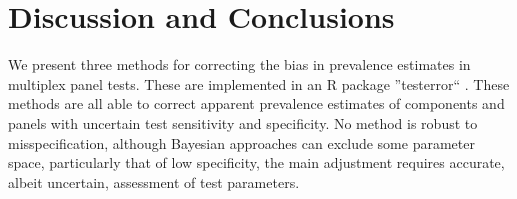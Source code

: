 \documentclass[a4paper, 12pt, twoside]{article}
\let\Oldsection\section
\renewcommand{\section}{\FloatBarrier\Oldsection}
\begin{document}
\section{Discussion and Conclusions}

We present three methods for correcting the bias in prevalence estimates in multiplex panel tests. These are implemented in an R package ''testerror`` \cite{challen2023}. These methods are all able to correct apparent prevalence estimates of components and panels with uncertain test sensitivity and specificity. No method is robust to misspecification, although Bayesian approaches can exclude some parameter space, particularly that of low specificity, the main adjustment requires accurate, albeit uncertain, assessment of test parameters.


\end{document}
